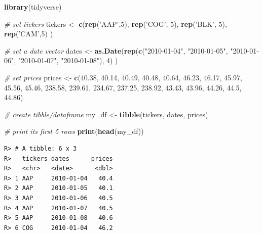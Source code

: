 \documentclass[
  12pt,
]{book}
\newenvironment{Shaded}{\begin{snugshade}}{\end{snugshade}}
\newcommand{\CommentTok}[1]{\textcolor[rgb]{0.37,0.37,0.37}{\textit{#1}}}
\newcommand{\DecValTok}[1]{\textcolor[rgb]{0.06,0.06,0.06}{#1}}
\newcommand{\FloatTok}[1]{\textcolor[rgb]{0.06,0.06,0.06}{#1}}
\newcommand{\KeywordTok}[1]{\textcolor[rgb]{0.27,0.27,0.27}{\textbf{#1}}}
\newcommand{\NormalTok}[1]{#1}
\newcommand{\StringTok}[1]{\textcolor[rgb]{0.5,0.5,0.5}{#1}}
\begin{document}
\begin{Shaded}
\begin{Highlighting}[]
\KeywordTok{library}\NormalTok{(tidyverse)}

\CommentTok{# set tickers}
\NormalTok{tickers <-}\StringTok{ }\KeywordTok{c}\NormalTok{(}\KeywordTok{rep}\NormalTok{(}\StringTok{'AAP'}\NormalTok{,}\DecValTok{5}\NormalTok{), }
             \KeywordTok{rep}\NormalTok{(}\StringTok{'COG'}\NormalTok{, }\DecValTok{5}\NormalTok{), }
             \KeywordTok{rep}\NormalTok{(}\StringTok{'BLK'}\NormalTok{, }\DecValTok{5}\NormalTok{), }
             \KeywordTok{rep}\NormalTok{(}\StringTok{'CAM'}\NormalTok{,}\DecValTok{5}\NormalTok{) )}

\CommentTok{# set a date vector}
\NormalTok{dates <-}\StringTok{ }\KeywordTok{as.Date}\NormalTok{(}\KeywordTok{rep}\NormalTok{(}\KeywordTok{c}\NormalTok{(}\StringTok{"2010-01-04"}\NormalTok{, }\StringTok{"2010-01-05"}\NormalTok{, }\StringTok{"2010-01-06"}\NormalTok{, }
                       \StringTok{"2010-01-07"}\NormalTok{, }\StringTok{"2010-01-08"}\NormalTok{), }\DecValTok{4}\NormalTok{) )}

\CommentTok{# set prices                      }
\NormalTok{prices <-}\StringTok{ }\KeywordTok{c}\NormalTok{(}\FloatTok{40.38}\NormalTok{,  }\FloatTok{40.14}\NormalTok{,  }\FloatTok{40.49}\NormalTok{,  }\FloatTok{40.48}\NormalTok{,  }\FloatTok{40.64}\NormalTok{,}
            \FloatTok{46.23}\NormalTok{,  }\FloatTok{46.17}\NormalTok{,  }\FloatTok{45.97}\NormalTok{,  }\FloatTok{45.56}\NormalTok{,  }\FloatTok{45.46}\NormalTok{,}
            \FloatTok{238.58}\NormalTok{, }\FloatTok{239.61}\NormalTok{, }\FloatTok{234.67}\NormalTok{, }\FloatTok{237.25}\NormalTok{, }\FloatTok{238.92}\NormalTok{,}
            \FloatTok{43.43}\NormalTok{,  }\FloatTok{43.96}\NormalTok{,  }\FloatTok{44.26}\NormalTok{,  }\FloatTok{44.5}\NormalTok{,   }\FloatTok{44.86}\NormalTok{)}

\CommentTok{# create tibble/dataframe}
\NormalTok{my_df <-}\StringTok{ }\KeywordTok{tibble}\NormalTok{(tickers, dates, prices)}

\CommentTok{# print its first 5 rows}
\KeywordTok{print}\NormalTok{(}\KeywordTok{head}\NormalTok{(my_df))}
\end{Highlighting}
\end{Shaded}

\begin{verbatim}
R> # A tibble: 6 x 3
R>   tickers dates      prices
R>   <chr>   <date>      <dbl>
R> 1 AAP     2010-01-04   40.4
R> 2 AAP     2010-01-05   40.1
R> 3 AAP     2010-01-06   40.5
R> 4 AAP     2010-01-07   40.5
R> 5 AAP     2010-01-08   40.6
R> 6 COG     2010-01-04   46.2
\end{verbatim}
\end{document}
